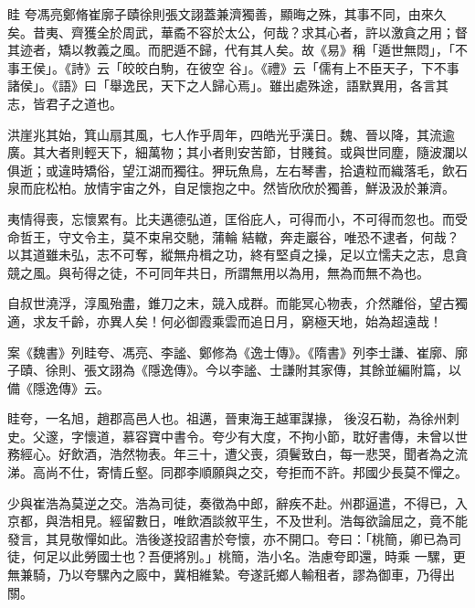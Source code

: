 
\begin{pinyinscope}

 眭
 夸馮亮鄭脩崔廓子賾徐則張文詡蓋兼濟獨善，顯晦之殊，其事不同，由來久矣。昔夷、齊獲全於周武，華矞不容於太公，何哉？求其心者，許以激貪之用；督其迹者，矯以教義之風。而肥遁不歸，代有其人矣。故《易》稱「遁世無悶」，「不事王侯」。《詩》云「皎皎白駒，在彼空
 谷」。《禮》云「儒有上不臣天子，下不事諸侯」。《語》曰「舉逸民，天下之人歸心焉」。雖出處殊途，語默異用，各言其志，皆君子之道也。



 洪崖兆其始，箕山扇其風，七人作乎周年，四皓光乎漢日。魏、晉以降，其流逾廣。其大者則輕天下，細萬物；其小者則安苦節，甘賤貧。或與世同塵，隨波瀾以俱逝；或違時矯俗，望江湖而獨往。狎玩魚鳥，左右琴書，拾遺粒而織落毛，飲石泉而庇松柏。放情宇宙之外，自足懷抱之中。然皆欣欣於獨善，鮮汲汲於兼濟。



 夷情得喪，忘懷累有。比夫邁德弘道，匡俗庇人，可得而小，不可得而忽也。而受命哲王，守文令主，莫不束帛交馳，蒲輪
 結轍，奔走巖谷，唯恐不逮者，何哉？以其道雖未弘，志不可奪，縱無舟楫之功，終有堅貞之操，足以立懦夫之志，息貪競之風。與茍得之徒，不可同年共日，所謂無用以為用，無為而無不為也。



 自叔世澆浮，淳風殆盡，錐刀之末，競入成群。而能冥心物表，介然離俗，望古獨適，求友千齡，亦異人矣！何必御霞乘雲而追日月，窮極天地，始為超遠哉！



 案《魏書》列眭夸、馮亮、李謐、鄭修為《逸士傳》。《隋書》列李士謙、崔廓、廓子賾、徐則、張文詡為《隱逸傳》。今以李謐、士謙附其家傳，其餘並編附篇，以備《隱逸傳》云。



 眭夸，一名旭，趙郡高邑人也。祖邁，晉東海王越軍謀掾，
 後沒石勒，為徐州刺史。父邃，字懷道，慕容寶中書令。夸少有大度，不拘小節，耽好書傳，未曾以世務經心。好飲酒，浩然物表。年三十，遭父喪，須鬢致白，每一悲哭，聞者為之流涕。高尚不仕，寄情丘壑。同郡李順願與之交，夸拒而不許。邦國少長莫不憚之。



 少與崔浩為莫逆之交。浩為司徒，奏徵為中郎，辭疾不赴。州郡逼遣，不得已，入京都，與浩相見。經留數日，唯飲酒談敘平生，不及世利。浩每欲論屈之，竟不能發言，其見敬憚如此。浩後遂投詔書於夸懷，亦不開口。夸曰：「桃簡，卿已為司徒，何足以此勞國士也？吾便將別。」桃簡，浩小名。浩慮夸即還，時乘
 一騾，更無兼騎，乃以夸騾內之廄中，冀相維縶。夸遂託鄉人輸租者，謬為御車，乃得出關。




\end{pinyinscope}
